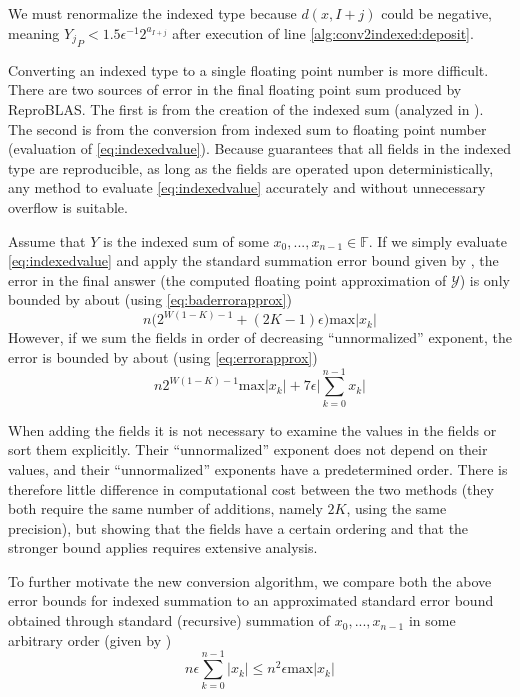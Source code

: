 \documentclass[12pt]{article}
\providecommand{\F}{\ensuremath{\mathbb{F}}}
\providecommand{\max}{\ensuremath{\text{max}}}
\theoremstyle{definition}
\numberwithin{equation}{section}
\numberwithin{figure}{section}
\begin{document}
    We must renormalize the indexed type because $d(x, I + j)$ could be negative, meaning ${Y_j}_P < 1.5  \epsilon^{-1} 2^{a_{I + j}}$ after execution of line \ref{alg:conv2indexed:deposit}.

    Converting an indexed type to a single floating point number is more difficult. There are two sources of error in the final floating point sum produced by ReproBLAS. The first is from the creation of the indexed sum (analyzed in \cite{repsum}). The second is from the conversion from indexed sum to floating point number (evaluation of  \eqref{eq:indexedvalue}).
    Because \cite{repsum} guarantees that all fields in the indexed type are reproducible, as long as the fields are operated upon deterministically, any method to evaluate  \eqref{eq:indexedvalue} accurately and without unnecessary overflow is suitable.

    Assume that $Y$ is the indexed sum of some $x_0, ..., x_{n - 1} \in \F$. If we simply evaluate \eqref{eq:indexedvalue} and apply the standard summation error bound given by \cite{higham}, the error in the final answer (the computed floating point approximation of $\mathcal{Y}$) is only bounded by about (using  \eqref{eq:baderrorapprox})
    \begin{equation}
      n \bigl(2^{W  (1 - K) - 1} + (2  K - 1)  \epsilon\bigr)\max|x_k|
      \label{eq:baderrorapproxdup}
    \end{equation}
    However, if we sum the fields in order of decreasing ``unnormalized'' exponent, the error is bounded by about (using  \eqref{eq:errorapprox})
    \begin{equation}
      n 2^{W  (1 - K) - 1}\max|x_k|  + 7 \epsilon \bigl|\sum\limits_{k = 0}^{n - 1} x_k\bigr|
      \label{eq:errorapproxdup}
    \end{equation}

    When adding the fields it is not necessary to examine the values in the fields or sort them explicitly. Their ``unnormalized'' exponent does not depend on their values, and their ``unnormalized'' exponents have a predetermined order. There is therefore little difference in computational cost between the two methods (they both require the same number of additions, namely $2  K$, using the same precision), but showing that the fields have a certain ordering and that the stronger bound applies requires extensive analysis.

    To further motivate the new conversion algorithm, we compare both the above error bounds for indexed summation to an approximated standard error bound obtained through standard (recursive) summation of $x_0, ..., x_{n - 1}$ in some arbitrary order (given by \cite{higham})
    \begin{equation}
      n  \epsilon  \sum\limits_{k = 0}^{n - 1}|x_k| \leq n^2  \epsilon  \max|x_k|
      \label{eq:naiveerrorapproxdup}
    \end{equation}
\end{document}
